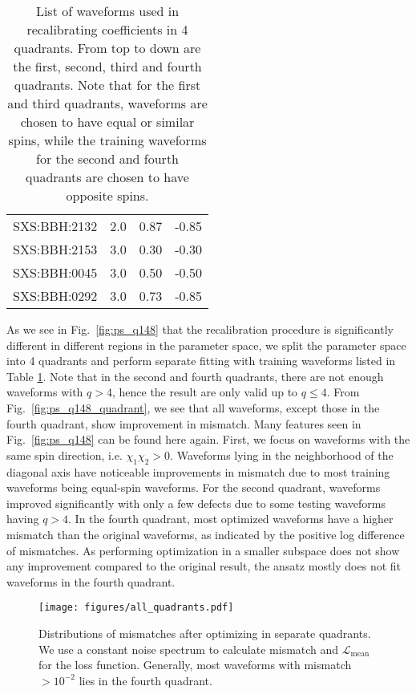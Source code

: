 \documentclass[twocolumn]{aastex631}
\begin{document}
\begin{table}[t]
\begin{tabularx}{0.8\columnwidth}{@{\extracolsep{\fill}}lrrr}
		SXS:BBH:2132 & 2.0 & 0.87     & -0.85    \\
		SXS:BBH:2153 & 3.0 & 0.30     & -0.30    \\
		SXS:BBH:0045 & 3.0 & 0.50     & -0.50    \\
		SXS:BBH:0292 & 3.0 & 0.73     & -0.85    \\ \midrule\bottomrule
	\end{tabularx}
	\caption{List of waveforms used in recalibrating coefficients in 4 quadrants. From top to down are the first, second, third and fourth quadrants. Note that for the first and third quadrants, waveforms are chosen to have equal or similar spins, while the training waveforms for the second and fourth quadrants are chosen to have opposite spins.}
	\label{tab:quadrants}
\end{table}

As we see in Fig.~\ref{fig:ps_q148} that the recalibration procedure is
significantly different in different regions in the parameter space, we split
the parameter space into 4 quadrants and perform separate fitting with training
waveforms listed in Table \ref{tab:quadrants}. Note that in the second and
fourth quadrants, there are not enough waveforms with $q>4$, hence the result
are only valid up to $q\leq4$. From Fig.~\ref{fig:ps_q148_quadrant}, we see that
all waveforms, except those in the fourth quadrant, show improvement in
mismatch. Many features seen in Fig.~\ref{fig:ps_q148} can be found here again.
First, we focus on waveforms with the same spin direction, i.e.
$\chi_1\chi_2>0$. Waveforms lying in the neighborhood of the diagonal axis have
noticeable improvements in mismatch due to most training waveforms being
equal-spin waveforms. For the second quadrant, waveforms improved significantly
with only a few defects due to some testing waveforms having $q>4$. In the
fourth quadrant, most optimized waveforms have a higher mismatch than the
original waveforms, as indicated by the positive log difference of mismatches.
As performing optimization in a smaller subspace does not show any improvement
compared to the original result, the ansatz mostly does not fit waveforms in the
fourth quadrant. 

\begin{figure}[t]
	\centering
	\texttt{[image: figures/all\_quadrants.pdf]}
	\caption{Distributions of mismatches after optimizing in separate quadrants.
	We use a constant noise spectrum to calculate mismatch and
	$\mathcal{L}_{\mathrm{mean}}$ for the loss function. Generally, most
	waveforms with mismatch $>10^{-2}$ lies in the fourth quadrant. }
	\label{fig:all_quadrants}
\end{figure}
\end{document}
